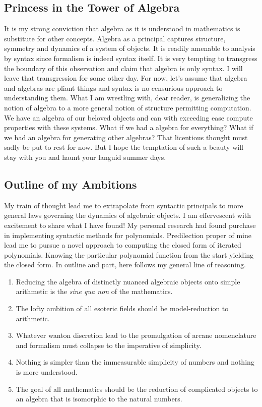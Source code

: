 \documentclass[12pt]{article}
\begin{document}
\subsection{Princess in the Tower of Algebra}
It is my strong conviction that algebra as it is understood in mathematics is
substitute for other concepts. Algebra as a principal captures structure,
symmetry and dynamics of a system of objects. It is readily amenable to
analysis by syntax since formalism is indeed syntax itself. It is very tempting
to transgress the boundary of this observation and claim that algebra is only
syntax. I will leave that transgression for some other day. For now, let's
assume that algebra and algebras are pliant things and syntax is no censurious
approach to understanding them. What I am wrestling with, dear reader, is
generalizing the notion of algebra to a more general notion of structure
permitting computation. We have an algebra of our beloved objects and can with
exceeding ease compute properties with these systems. What if we had a algebra
for everything? What if we had an algebra for generating other algebras? That
licentious thought must sadly be put to rest for now. But I hope the temptation
of such a beauty will stay with you and haunt your languid summer days.

\subsection{Outline of my Ambitions}
My train of thought lead me to extrapolate from syntactic principals to more
general laws governing the dynamics of algebraic objects. I am effervescent
with excitement to share what I have found! My personal research had found
purchase in implementing syntactic methods for polynomials. Predilection proper
of mine lead me to pursue a novel approach to computing the closed form of
iterated polynomials. Knowing the particular polynomial function from the start
yielding the closed form. In outline and part, here follows my general line of
reasoning.

\begin{enumerate}
    \item Reducing the algebra of distinctly nuanced algebraic objects onto simple
          arithmetic is the \textit{sine qua non} of the mathematics.
    \item The lofty ambition of all esoteric fields should be model-reduction to
          arithmetic.
    \item Whatever wanton discretion lead to the promulgation of arcane nomenclature and
          formalism must collapse to the imperative of simplicity.
    \item Nothing is simpler than the immeasurable simplicity of numbers and nothing is
          more understood.
    \item The goal of all mathematics should be the reduction of complicated objects to
          an algebra that is isomorphic to the natural numbers.
\end{enumerate}
\end{document}
